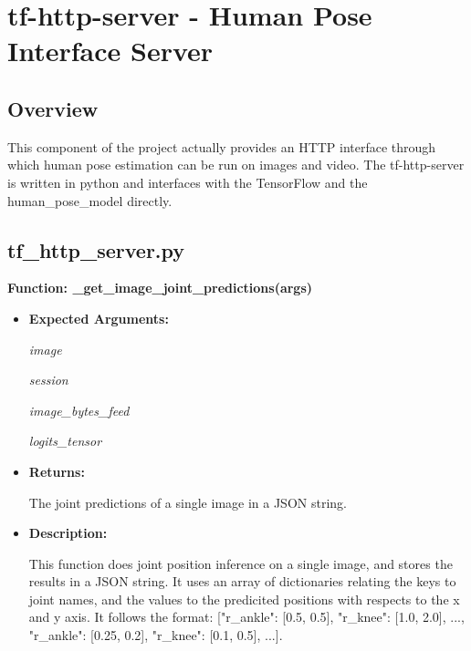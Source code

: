 \documentclass{scrreprt}
\begin{document}
\break

\section{tf-http-server - Human Pose Interface Server}

\subsection{Overview}

This component of the project actually provides an HTTP interface through which human pose estimation can be run on images and video. The tf-http-server is written in python and interfaces with the TensorFlow and the human\_pose\_model directly.

\subsection{tf\_http\_server.py}

\textbf{Function: \_get\_image\_joint\_predictions(args)}
\begin{itemize}
    \item \textbf{Expected Arguments:}

            \quad\textit{image}

            \quad\textit{session}

            \quad\textit{image\_bytes\_feed}

            \quad\textit{logits\_tensor}

    \item \textbf{Returns:}

            The joint predictions of a single image in a JSON string.

    \item \textbf{Description:}

            This function does joint position inference on a single image, and stores the results in a JSON string. It uses an array of dictionaries relating the keys to joint names, and the values to the predicited positions with respects to the x and y axis. It follows the format: [{"r\_ankle": [0.5, 0.5], "r\_knee": [1.0, 2.0], ...}, {"r\_ankle": [0.25, 0.2], "r\_knee": [0.1, 0.5], ...}].

\end{itemize}
\end{document}
